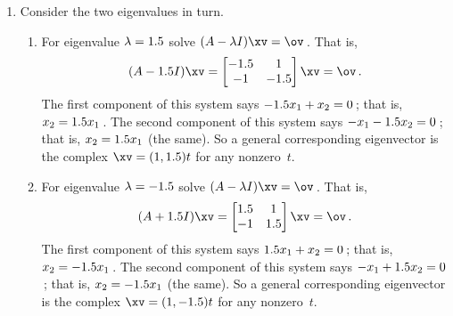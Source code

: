 \begin{example}
\begin{solution}
\begin{enumerate}
\item Consider the two eigenvalues in turn.
\begin{enumerate}
\item For eigenvalue \(\lambda=1.5\) solve \((A-\lambda I)\xv=\ov\)\,.  That is,
\begin{equation*}
(A-\i I)\xv
=\begin{bmatrix} -\i&1\\
-1&-\i \end{bmatrix}\xv
=\ov\,.
\end{equation*}
The first component of this system says \(-1.5 x_1+x_2=0\)\,; that is, \(x_2=1.5 x_1\)\,.  
The second component of this system says \(-x_1-1.5 x_2=0\)\,; that is, \(x_2=1.5 x_1\) (the same).  
So a general corresponding eigenvector is the complex \(\xv=(1,\i)t\) for any nonzero~\(t\).
\item For eigenvalue \(\lambda=-1.5\) solve \((A-\lambda I)\xv=\ov\)\,.  That is,
\begin{equation*}
(A+\i I)\xv
=\begin{bmatrix} \i&1\\
-1&\i \end{bmatrix}\xv
=\ov\,.
\end{equation*}
The first component of this system says \(1.5 x_1+x_2=0\)\,; that is, \(x_2=-1.5 x_1\)\,.  
The second component of this system says \(-x_1+1.5 x_2=0\)\,; that is, \(x_2=-1.5 x_1\) (the same).  
So a general corresponding eigenvector is the complex \(\xv=(1,-\i)t\) for any nonzero~\(t\).
\end{enumerate}
\end{enumerate}
\end{solution}
\end{example}


